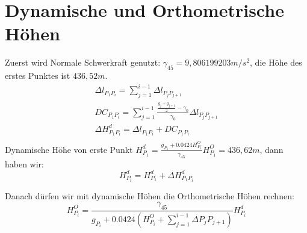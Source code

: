 \documentclass[12pt]{article}
\begin{document}
\section{Dynamische und Orthometrische Höhen}
Zuerst wird Normale Schwerkraft genutzt: $\gamma_{45} = 9,806199203 m/s^2$, die Höhe des erstes Punktes ist $436,52m$.
\begin{gather*}
\Delta l_{P_1 P_i} = \sum_{j=1}^{i-1} \Delta l_{P_j P_{j+1}} \\
DC_{P_1 P_{i}} = \sum_{j=1}^{i-1} \frac{\frac{g_j + g_{j+1}}{2} - \gamma_0}{\gamma_0} \Delta l_{P_j P_{j+1}} \\
\Delta H^d_{P_1 P_i} = \Delta l_{P_1 P_i} + DC_{P_1 P_{i}} \\
\end{gather*} 
Dynamische Höhe von erste Punkt $H_{P_1}^d = \frac{g_{P_1} + 0.0424 H^{O}_{P_1}}{\gamma_{45}} H^{O}_{P_1} = 436,62m$, dann haben wir: 
\begin{equation*}
H_{P_i}^{d} = H_{P_1}^{d} + \Delta H_{P_1 P_i}^d 
\end{equation*}
\begin{figure}[ht]\centering
\end{figure}
\newpage
Danach dürfen wir mit dynamische Höhen die Orthometrische Höhen rechnen:
\begin{equation*}
H_{P_i}^{O} = \frac{\gamma_{45}}{g_{P_i} + 0.0424(H^{O}_{P_i} + \sum_{j=1}^{i-1} \Delta P_j P_{j+1})} H^d_{P_i}
\end{equation*} 
\begin{figure}[ht]\centering
\end{figure}
\end{document}
